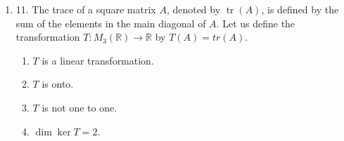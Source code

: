 \documentclass{article}
\newenvironment{answers}{ %
	\begin{enumerate}
		\setlength{\itemsep}{\bigskipamount}
}{\end{enumerate}}
\newcommand{\R}{\mathbb{R}}
\newcommand{\tr}{\operatorname{tr}}
\begin{document}
\begin{answers}
\begin{enumerate}
				For \(T\) to meet these constraints, the following must hold true.
				\begin{equation*}
					\forall s,t \in \R,\ T((2,2,1) + s(1,1,1) + t(1,4,0)) = (0,3,1)
				\end{equation*}
				By linearity of \(T\), we can then say the following.
				\begin{equation*}
					\forall s,t \in \R,\ T(2,2,1) + s + tT(1,4,0) = (0,3,1)
				\end{equation*}
				Yet this can only be true if \(T(1,1,1) = T(1,4,0) = (0,0,0)\) and \(T(2,2,1) = (0,3,1)\).

				Thus we have defined \(T\) on three vectors in \(\R^3\), and these form a basis over \(\R^3\), since there are as many of them as the dimension and they are independent. Hence we conclude that \(T\) is indeed unique.
		\end{enumerate}

	\item[11.]
		The trace of a square matrix \(A\), denoted by \(\tr(A)\), is defined by the sum of the elements in the main diagonal of \(A\). Let us define the transformation \(T : M_3(\R) \to \R\) by \(T(A) = tr(A)\).
		\begin{enumerate}
			\item \(T\) is a linear transformation.
			\item \(T\) is onto.
			\item \(T\) is not one to one.
			\item \(\dim \ker T = 2\).
		\end{enumerate}

\end{answers}
\end{document}
